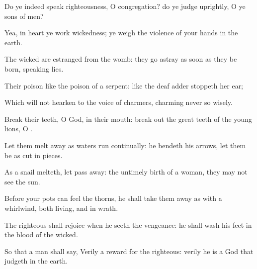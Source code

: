 {\Q {}Do ye
indeed
speak
righteousness, O
congregation? do ye
judge
uprightly, O ye
sons of
men?


\par }{\Q {}Yea, in
heart ye
work
wickedness; ye
weigh the
violence of your
hands in the
earth.


\par }{\Q {}The
wicked are
estranged from the
womb: they go
astray as soon as they be
born,
speaking
lies.


\par }{\Q {}Their
poison
{}
like the
poison of a
serpent:
{} like the
deaf
adder
{}
stoppeth her
ear;


\par }{\Q {}Which will not
hearken to the
voice of
charmers,
charming never so
wisely.


\par }{\BB \par }
{\Q {}Break their
teeth, O
God, in their
mouth: break
out the great
teeth of the young
lions, O
{}.


\par }{\Q {}Let them melt
away as
waters
{} run
continually:
{} he
bendeth
{} his
arrows, let them be as cut in
pieces.


\par }{\Q {}As a
snail
{}
melteth, let
{} pass
away:
{} the untimely
birth of a
woman,
{} they may not
see the
sun.


\par }{\Q {}Before your
pots can
feel the
thorns, he shall take them away as with a
whirlwind, both
living, and in
{}
wrath.


\par }{\Q {}The
righteous shall
rejoice when he
seeth the
vengeance: he shall
wash his
feet in the
blood of the
wicked.


\par }{\Q {}So that a
man shall
say, Verily
{} a
reward for the
righteous: verily he
is a
God that
judgeth in the
earth.




\par }
